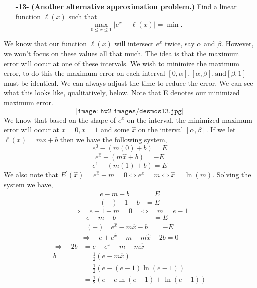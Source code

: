 \documentclass[11pt]{article}
\theoremstyle{definition}
\newcommand{\1}[1]{\mathbf{1} \left \{ #1 \right \}}
\begin{document}
\begin{itemize}
    \item[{\textbf{-13-}}] \textbf{(Another alternative approximation problem.)}  Find a linear function $\ell(x)$ such that
    \begin{equation}
        \max_{0 \leq x \leq 1} |e^x - \ell(x)| = \min.
    \end{equation}
\end{itemize}
We know that our function $\ell(x)$ will intersect $e^x$ twice, say $\alpha$ and $\beta$.  However, we won't focus on these values all that much.  The idea is that the maximum error will occur at one of these intervals.  We wish to minimize the maximum error, to do this the maximum error on each interval \([0, \alpha], [\alpha, \beta], \text{and} [\beta, 1]\) must be identical.  We can always adjust the time to reduce the error.  We can see what this looks like, qualitatively, below.  Note that E denotes our minimized maximum error.
\[\texttt{[image: hw2\_images/desmos13.jpg]}\]
We know that based on the shape of $e^x$ on the interval, the minimized maximum error will occur at $x=0, x=1$ and some $\hat{x}$ on the interval $[\alpha, \beta]$.  If we let $\ell(x) = mx+b$ then we have the following system,
\[e^0 - (m(0) + b) = E\]
\[e^{\hat{x}} - (m\hat{x} + b) = -E\]
\[e^1 - (m(1) + b) = E\]
We also note that \(E^{\prime}(\hat{x}) = e^{\hat{x}} - m = 0 \Leftrightarrow e^{\hat{x}} = m \Leftrightarrow \hat{x} = \ln (m)\).  Solving the system we have,
\begin{align*}
    e - m - b &= E \\
    (-) \quad 1 - b &= E
\end{align*}
\[\Longrightarrow \quad e - 1 - m = 0 \quad \Longleftrightarrow \quad m = e - 1\]
\begin{align*}
    e - m - b &= E \\
    (+) \quad e^{\hat{x}} - m\hat{x} - b &= -E
\end{align*}
\[\Longrightarrow \quad e + e^{\hat{x}} - m - m\hat{x} - 2b = 0 \]
\begin{equation*}
    \begin{split}
        \Longrightarrow \quad 2b &= e + e^{\hat{x}} - m - m\hat{x} \\
        b &= \frac{1}{2}\left(e - m\hat{x}\right) \\
        &= \frac{1}{2}\left(e - (e - 1)\ln(e - 1)\right) \\
        &= \frac{1}{2}\left(e - e\ln(e - 1) + \ln(e - 1)\right)
    \end{split}
\end{equation*}
\end{document}
